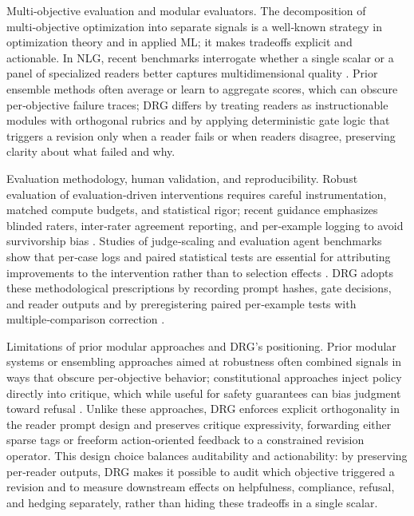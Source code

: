 \documentclass{article}
\begin{document}
Multi‑objective evaluation and modular evaluators. The decomposition of multi‑objective optimization into separate signals is a well‑known strategy in optimization theory and in applied ML; it makes tradeoffs explicit and actionable. In NLG, recent benchmarks interrogate whether a single scalar or a panel of specialized readers better captures multidimensional quality \cite{marco2025reader}. Prior ensemble methods often average or learn to aggregate scores, which can obscure per‑objective failure traces; DRG differs by treating readers as instructionable modules with orthogonal rubrics and by applying deterministic gate logic that triggers a revision only when a reader fails or when readers disagree, preserving clarity about what failed and why.

Evaluation methodology, human validation, and reproducibility. Robust evaluation of evaluation‑driven interventions requires careful instrumentation, matched compute budgets, and statistical rigor; recent guidance emphasizes blinded raters, inter‑rater agreement reporting, and per‑example logging to avoid survivorship bias \cite{nyberg2021estimating}. Studies of judge‑scaling and evaluation agent benchmarks show that per‑case logs and paired statistical tests are essential for attributing improvements to the intervention rather than to selection effects \cite{zhang2024evaluation}. DRG adopts these methodological prescriptions by recording prompt hashes, gate decisions, and reader outputs and by preregistering paired per‑example tests with multiple‑comparison correction \cite{liu2024reife}.

Limitations of prior modular approaches and DRG's positioning. Prior modular systems or ensembling approaches aimed at robustness often combined signals in ways that obscure per‑objective behavior; constitutional approaches inject policy directly into critique, which while useful for safety guarantees can bias judgment toward refusal \cite{ivgi2024loops, lu2025argus}. Unlike these approaches, DRG enforces explicit orthogonality in the reader prompt design and preserves critique expressivity, forwarding either sparse tags or freeform action‑oriented feedback to a constrained revision operator. This design choice balances auditability and actionability: by preserving per‑reader outputs, DRG makes it possible to audit which objective triggered a revision and to measure downstream effects on helpfulness, compliance, refusal, and hedging separately, rather than hiding these tradeoffs in a single scalar.
\end{document}
